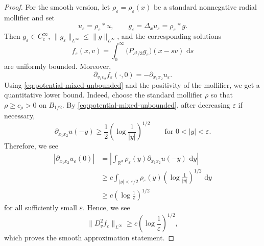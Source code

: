 \documentclass[11pt,reqno]{amsart}
\numberwithin{equation}{section}
\theoremstyle{remark}
\newcommand{\R}{\mathbb{R}}
\newcommand{\dd}{\,\mathrm{d}}
\begin{document}
\begin{proof}
For the smooth version, let \(\rho_\varepsilon=\rho_\varepsilon(x)\) be a standard nonnegative
radial mollifier and set
\[
   u_\varepsilon=\rho_\varepsilon*u,
   \qquad
   g_\varepsilon=\Delta_xu_\varepsilon=\rho_\varepsilon*g.
\]
Then \(g_\varepsilon\in C_c^\infty\), \(\|g_\varepsilon\|_{L^\infty}\le
\|g\|_{L^\infty}\), and the corresponding solutions
\[
   f_\varepsilon(x,v)=\int_0^\infty
      \big(P_{s^3/3}g_\varepsilon\big)(x-sv)\,\dd s
\]
are uniformly bounded.  Moreover,
\[
   \partial_{v_1v_2}f_\varepsilon(\cdot,0)
   =-\partial_{x_1x_2}u_\varepsilon.
\]
Using \eqref{eq:potential-mixed-unbounded} and the positivity of the mollifier,
we get a quantitative lower bound.  Indeed, choose the standard mollifier
\(\rho\) so that \(\rho\ge c_\rho>0\) on \(B_{1/2}\).  By
\eqref{eq:potential-mixed-unbounded}, after decreasing \(\varepsilon\) if
necessary,
\[
   \partial_{x_1x_2}u(-y)
   \ge \frac12\left(\log\frac1{|y|}\right)^{1/2}
   \qquad\text{for }0<|y|<\varepsilon.
\]
Therefore, we see
\[
\begin{aligned}
   |\partial_{x_1x_2}u_\varepsilon(0)|
   &=\left|\int_{\R^d}\rho_\varepsilon(y)
        \partial_{x_1x_2}u(-y)\,\dd y\right| \\
   &\ge c\int_{|y|<\varepsilon/2}\rho_\varepsilon(y)
        \left(\log\frac1{|y|}\right)^{1/2}\,\dd y \\
   &\ge c\left(\log\frac1\varepsilon\right)^{1/2}
\end{aligned}
\]
for all sufficiently small \(\varepsilon\).  Hence, we see
\[
   \|D_v^2f_\varepsilon\|_{L^\infty}
   \ge c\left(\log\frac1\varepsilon\right)^{1/2},
\]
which proves the smooth approximation statement.
\end{proof}
\end{document}

